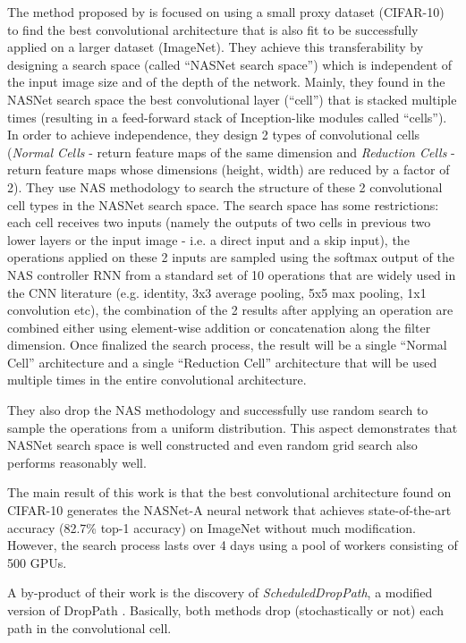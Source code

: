 \documentclass[conference]{IEEEtran}
\begin{document}
The method proposed by \cite{Zoph2018} is focused on using a small proxy dataset (CIFAR-10) to find the best convolutional architecture that is also fit to be successfully applied on a larger dataset (ImageNet). They achieve this transferability by designing a search space (called “NASNet search space”) which is independent of the input image size and of the depth of the network. Mainly, they found in the NASNet search space the best convolutional layer (“cell”) that is stacked multiple times (resulting in a feed-forward stack of Inception-like modules called “cells”). In order to achieve independence, they design 2 types of convolutional cells (\textit{Normal Cells} - return feature maps of the same dimension and \textit{Reduction Cells} - return feature maps whose dimensions (height, width) are reduced by a factor of 2). They use NAS methodology to search the structure of these 2 convolutional cell types in the NASNet search space. The search space has some restrictions: each cell receives two inputs (namely the outputs of two cells in previous two lower layers or the input image - i.e. a direct input and a skip input), the operations applied on these 2 inputs are sampled using the softmax output of the NAS controller RNN from a standard set of 10 operations that are widely used in the CNN literature (e.g. identity, 3x3 average pooling, 5x5 max pooling, 1x1 convolution etc), the combination of the 2 results after applying an operation are combined either using element-wise addition or concatenation along the filter dimension. Once finalized the search process, the result will be a single “Normal Cell” architecture and a single “Reduction Cell” architecture that will be used multiple times in the entire convolutional architecture.

They also drop the NAS methodology and successfully use random search to sample the operations from a uniform distribution. This aspect demonstrates that NASNet search space  is well constructed and even random grid search also performs reasonably well. 

The main result of this work is that the best convolutional architecture found on CIFAR-10 generates the NASNet-A neural network that achieves state-of-the-art accuracy (82.7\% top-1 accuracy) on ImageNet without much modification. However, the search process lasts over 4 days using a pool of workers consisting of 500 GPUs.

A by-product of their work is the discovery of \textit{ScheduledDropPath}, a modified version of DropPath \cite{larsson2017fractalnet}.  Basically, both methods drop (stochastically or not) each path in the convolutional cell.
\end{document}
